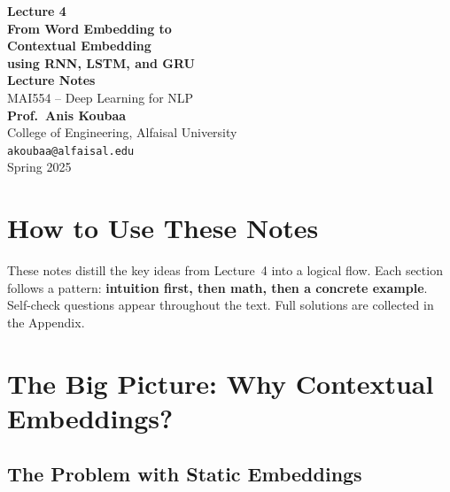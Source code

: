 \documentclass[11pt,a4paper]{article}
\begin{document}
\begin{titlepage}
\centering
\vspace*{3cm}

{\Huge\bfseries\color{alfaisalgreen} Lecture 4}\\[0.8cm]
{\LARGE\bfseries From Word Embedding to\\[0.3cm] Contextual Embedding\\[0.3cm] using RNN, LSTM, and GRU}\\[1.5cm]

{\Large\textbf{Lecture Notes}}\\[0.5cm]
{\large MAI554 -- Deep Learning for NLP}\\[2cm]

{\large\textbf{Prof.\ Anis Koubaa}}\\[0.3cm]
{\normalsize College of Engineering, Alfaisal University}\\[0.2cm]
{\normalsize\texttt{akoubaa@alfaisal.edu}}\\[3cm]

{\normalsize Spring 2025}

\vfill
\end{titlepage}

\section*{How to Use These Notes}

These notes distill the key ideas from Lecture~4 into a logical flow. Each section follows a pattern: \textbf{intuition first, then math, then a concrete example}. Self-check questions appear throughout the text. Full solutions are collected in the Appendix.

\tableofcontents
\newpage

\section{The Big Picture: Why Contextual Embeddings?}

\subsection{The Problem with Static Embeddings}
\end{document}
